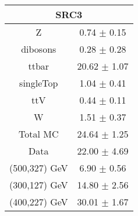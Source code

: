 \begin{tabular}{c|c}
\hline\hline
\multicolumn{2}{c}{\bf SRC3 } \\ \hline 
Z & 0.74 $\pm$ 0.15 \\
dibosons & 0.28 $\pm$ 0.28 \\
ttbar & 20.62 $\pm$ 1.07 \\
singleTop & 1.04 $\pm$ 0.41 \\
ttV & 0.44 $\pm$ 0.11 \\
W & 1.51 $\pm$ 0.37 \\
\hline
Total MC & 24.64 $\pm$ 1.25 \\
Data & 22.00 $\pm$ 4.69 \\
\hline
(500,327) GeV & 6.90 $\pm$ 0.56 \\
\hline
 (300,127) GeV & 14.80 $\pm$ 2.56  \\
\hline
(400,227) GeV & 30.01 $\pm$ 1.67\\
\hline\hline
\end{tabular}

